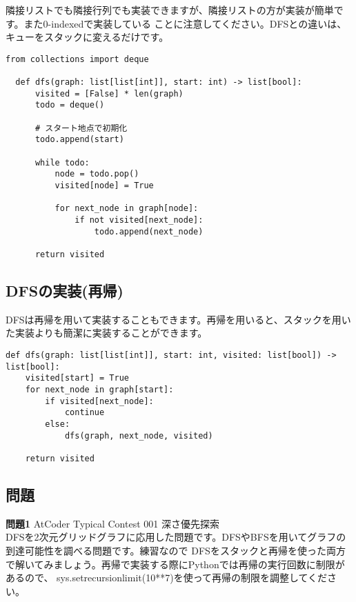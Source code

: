 隣接リストでも隣接行列でも実装できますが、隣接リストの方が実装が簡単です。また0-indexedで実装している
ことに注意してください。DFSとの違いは、キューをスタックに変えるだけです。

\begin{lstlisting}[caption=深さ優先探索ヒープの実装, label=dfs, frame=TRBL, label={dfs}]
  from collections import deque

  def dfs(graph: list[list[int]], start: int) -> list[bool]:
      visited = [False] * len(graph)
      todo = deque()
      
      # スタート地点で初期化
      todo.append(start)
      
      while todo:
          node = todo.pop()
          visited[node] = True
          
          for next_node in graph[node]:
              if not visited[next_node]:
                  todo.append(next_node)
                  
      return visited
\end{lstlisting}
\subsection{DFSの実装(再帰)}
DFSは再帰を用いて実装することもできます。再帰を用いると、スタックを用いた実装よりも簡潔に実装することができます。

\begin{lstlisting}[caption=深さ優先探索再帰の実装, label=dfs_recursive, frame=TRBL, label={dfs_recursive}]
def dfs(graph: list[list[int]], start: int, visited: list[bool]) -> list[bool]:   
    visited[start] = True
    for next_node in graph[start]:
        if visited[next_node]:
            continue
        else:
            dfs(graph, next_node, visited)
    
    return visited
\end{lstlisting}

\subsection{問題}
\textbf{問題1} AtCoder Typical Contest 001 深さ優先探索 \\
DFSを2次元グリッドグラフに応用した問題です。DFSやBFSを用いてグラフの到達可能性を調べる問題です。練習なので
DFSをスタックと再帰を使った両方で解いてみましょう。再帰で実装する際にPythonでは再帰の実行回数に制限があるので、
sys.setrecursionlimit(10**7)を使って再帰の制限を調整してください。 \\


